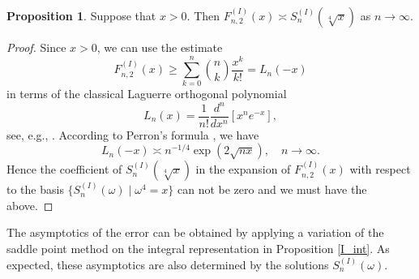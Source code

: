 \documentclass[a4paper,12pt,oneside]{article}
\theoremstyle{definition}
\newtheorem{prop}[defi]{Proposition}
\begin{document}
\begin{prop} \label{I_AQ_denom}
Suppose that $x>0$. Then $F_{n,2}^{(I)}(x) \asymp S_{n}^{(I)}(\sqrt[4]{x})$ as $n\to\infty$.
\end{prop}
\begin{proof}
Since $x>0$, we can use the estimate
    $$F_{n,2}^{(I)}(x) \geq \sum_{k=0}^{n} \binom{n}{k} \frac{x^k}{k!} = L_{n}(-x) $$
in terms of the classical Laguerre orthogonal polynomial 
$$L_n(x) = \frac{1}{n!} \frac{d^n}{dx^n}[x^n e^{-x}],$$
see, e.g., \cite[Chapter 5]{Szego}. According to Perron's formula \cite[Theorem 8.22.3]{Szego}, we have
$$L_{n}(-x) \asymp n^{-1/4} \exp\left(2\sqrt{nx} \right),\quad n\to\infty.$$
Hence the coefficient of $S_{n}^{(I)}(\sqrt[4]{x})$ in the expansion of $F_{n,2}^{(I)}(x)$ with respect to the basis $\{S_n^{(I)}(\omega) \mid \omega^4=x\}$ can not be zero and we must have the above.
\end{proof}

The asymptotics of the error can be obtained by applying a variation of the saddle point method on the integral representation in Proposition \ref{I_int}. As expected, these asymptotics are also determined by the solutions $S_n^{(I)}(\omega)$.
\end{document}

